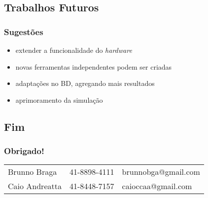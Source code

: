 \subsection{Trabalhos Futuros}
    \begin{frame}\frametitle{Sugestões}
	\begin{itemize}
		\item extender a funcionalidade do \emph{hardware}
		\item novas ferramentas independentes podem ser criadas
		\item adaptações no BD, agregando mais resultados
		\item aprimoramento da simulação
	\end{itemize}
    \end{frame}
    
\subsection{Fim}
    \begin{frame}\frametitle{Obrigado!}
        \begin{table}[!h]
	        \begin{tabular}{lll}
                Brunno Braga & 41-8898-4111 & brunnobga@gmail.com \\
                Caio Andreatta & 41-8448-7157 & caioccaa@gmail.com \\
	        \end{tabular}
        \end{table}
    \end{frame}
